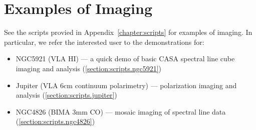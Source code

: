 \section{Examples of Imaging}
\label{section:im.examples}

See the scripts provied in Appendix~\ref{chapter:scripts} for examples of
imaging.  In particular, we refer
the interested user to the demonstrations for:
\begin{itemize}
\item NGC5921 (VLA HI) --- a quick demo of basic CASA spectral line
      cube imaging and analysis
      (\ref{section:scripts.ngc5921})
\item Jupiter (VLA 6cm continuum polarimetry) --- polarization imaging
      and analysis
      (\ref{section:scripts.jupiter})
\item NGC4826 (BIMA 3mm CO) --- mosaic imaging of spectral line data
      (\ref{section:scripts.ngc4826})
\end{itemize}

